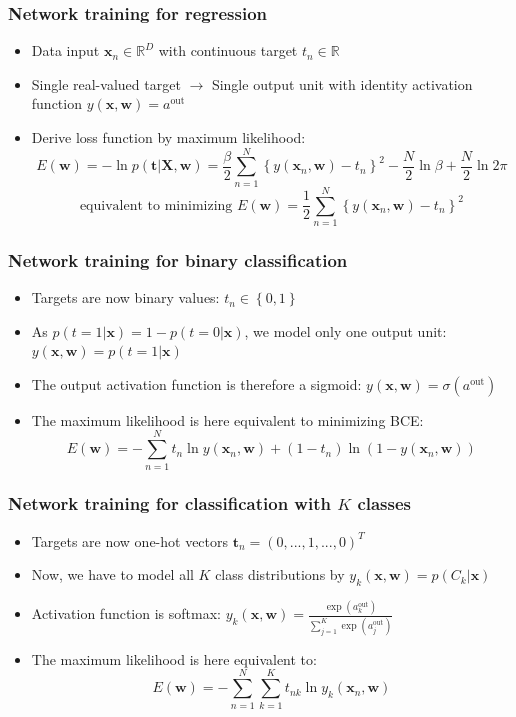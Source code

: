 \subsubsection{Network training for regression}
\begin{itemize}
	\item Data input $\bm{x}_n \in \mathbb{R}^{D}$ with continuous target $t_n \in \mathbb{R}$
	\item Single real-valued target $\to$ Single output unit with identity activation function $y\left(\bm{x}, \bm{w}\right) = a^{\text{out}}$
	\item Derive loss function by maximum likelihood:
	$$E(\bm{w}) = -\ln p\left(\bm{t}|\bm{X}, \bm{w}\right) = \frac{\beta}{2}\sum\limits_{n=1}^{N}\left\{y(\bm{x}_n, \bm{w}) - t_n\right\}^2 - \frac{N}{2}\ln\beta + \frac{N}{2}\ln 2\pi $$
	$$\text{equivalent to minimizing } E(\bm{w})=\frac{1}{2}\sum\limits_{n=1}^{N}\left\{y(\bm{x}_n, \bm{w}) - t_n\right\}^2$$
\end{itemize}
\subsubsection{Network training for binary classification}
\begin{itemize}
	\item Targets are now binary values: $t_n\in\left\{0,1\right\}$
	\item As $p\left(t=1|\bm{x}\right) = 1 - p\left(t=0|\bm{x}\right)$, we model only one output unit: $y\left(\bm{x},\bm{w}\right) = p\left(t=1|\bm{x}\right)$
	\item The output activation function is therefore a sigmoid: $y\left(\bm{x}, \bm{w}\right) = \sigma\left(a^{\text{out}}\right)$
	\item The maximum likelihood is here equivalent to minimizing BCE: $$E\left(\bm{w}\right) = -\sum\limits_{n=1}^{N} t_n \ln y\left(\bm{x}_n, \bm{w}\right) + (1 - t_n) \ln \left(1 - y\left(\bm{x}_n, \bm{w}\right)\right)$$
\end{itemize}
\subsubsection{Network training for classification with $K$ classes}
\begin{itemize}
	\item Targets are now one-hot vectors $\bm{t}_n = \left(0,...,1,...,0\right)^T$
	\item Now, we have to model all $K$ class distributions by $y_k\left(\bm{x}, \bm{w}\right) = p\left(C_k|\bm{x}\right)$
	\item Activation function is softmax: $y_k\left(\bm{x}, \bm{w}\right) = \frac{\exp\left(a_k^{\text{out}}\right)}{\sum_{j=1}^{K}\exp\left(a_j^{\text{out}}\right)}$
	\item The maximum likelihood is here equivalent to:
	$$E\left(\bm{w}\right) = - \sum\limits_{n=1}^{N} \sum\limits_{k=1}^{K} t_{nk} \ln y_k\left(\bm{x}_n, \bm{w}\right)$$
\end{itemize}
